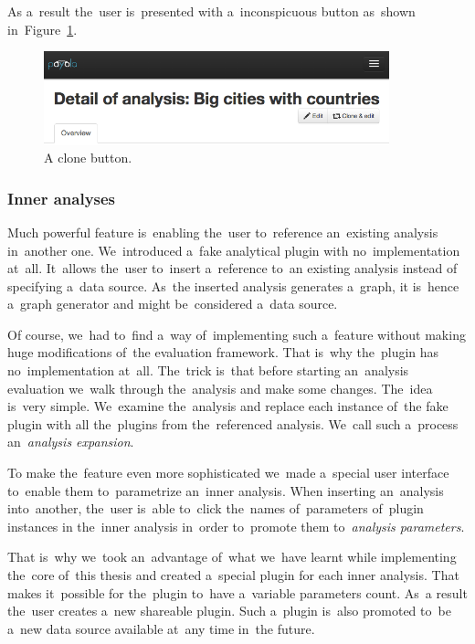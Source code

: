 As a~result the~user is~presented with a~inconspicuous button as~shown in~Figure~\ref{fig:clone-button}.

\begin{figure}
	\centering
	\includegraphics[width=100mm]{img/clone-button.png}
	\caption{A clone button.}
	\label{fig:clone-button}
\end{figure}

\subsubsection{Inner analyses}
Much powerful feature is~enabling the~user to~reference an~existing analysis in~another one. We~introduced a~fake analytical plugin with no~implementation at~all. It~allows the~user to~insert a~reference to~an existing analysis instead 
of specifying a~data source. As~the inserted analysis generates a~graph, 
it is~hence a~graph generator and might be~considered a~data source.

Of course, we~had to~find a~way of~implementing such a~feature without 
making huge modifications of~the evaluation framework. That is~why the~plugin 
has no~implementation at~all. The~trick is~that before starting an~analysis 
evaluation we~walk through the~analysis and make some changes. The~idea is~very 
simple. We~examine the~analysis and replace each instance of~the fake plugin 
with all the~plugins from the~referenced analysis. We~call such a~process an~\emph{analysis expansion}.

To make the~feature even more sophisticated we~made a~special user interface to~enable them to~parametrize an~inner analysis. When inserting an~analysis into~another, the~user is~able to~click the~names of~parameters of~plugin instances 
in the~inner analysis in~order to~promote them to~\emph{analysis parameters}.

That is~why we~took an~advantage of~what we~have learnt while implementing the~core of~this thesis and created a~special plugin for each inner analysis. That 
makes it~possible for the~plugin to~have a~variable parameters count. As~a result the~user creates a~new shareable plugin. Such a~plugin is~also promoted to~be a~new 
data source available at~any time in~the future.

